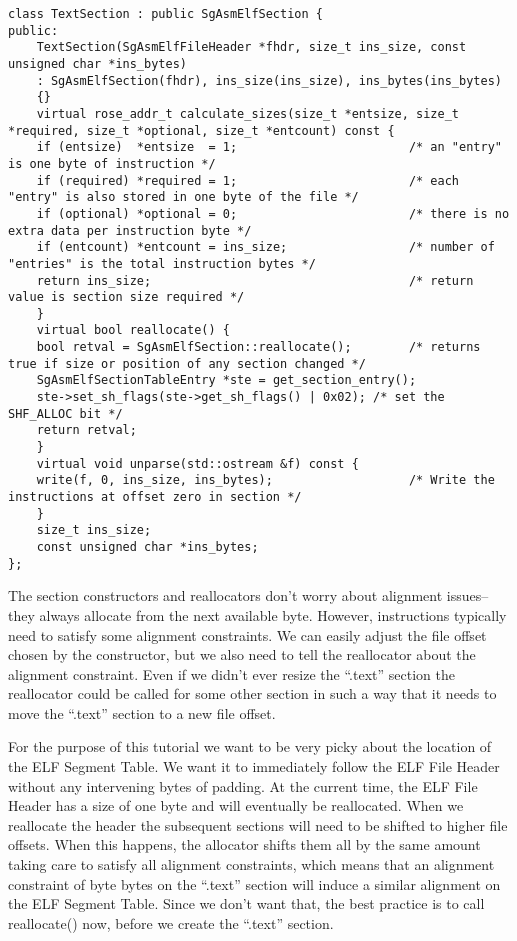 \begin{verbatim}
class TextSection : public SgAsmElfSection {
public:
    TextSection(SgAsmElfFileHeader *fhdr, size_t ins_size, const unsigned char *ins_bytes)
	: SgAsmElfSection(fhdr), ins_size(ins_size), ins_bytes(ins_bytes)
	{}
    virtual rose_addr_t calculate_sizes(size_t *entsize, size_t *required, size_t *optional, size_t *entcount) const {
	if (entsize)  *entsize  = 1;                        /* an "entry" is one byte of instruction */
	if (required) *required = 1;                        /* each "entry" is also stored in one byte of the file */
	if (optional) *optional = 0;                        /* there is no extra data per instruction byte */
	if (entcount) *entcount = ins_size;                 /* number of "entries" is the total instruction bytes */
	return ins_size;                                    /* return value is section size required */
    }
    virtual bool reallocate() {
	bool retval = SgAsmElfSection::reallocate();        /* returns true if size or position of any section changed */
	SgAsmElfSectionTableEntry *ste = get_section_entry();
	ste->set_sh_flags(ste->get_sh_flags() | 0x02); /* set the SHF_ALLOC bit */
	return retval;
    }
    virtual void unparse(std::ostream &f) const {
	write(f, 0, ins_size, ins_bytes);                   /* Write the instructions at offset zero in section */
    }
    size_t ins_size;
    const unsigned char *ins_bytes;
};
\end{verbatim}

The section constructors and reallocators don't worry about alignment
issues--they always allocate from the next available byte. However,
instructions typically need to satisfy some alignment constraints. We
can easily adjust the file offset chosen by the constructor, but we
also need to tell the reallocator about the alignment constraint. Even
if we didn't ever resize the ``.text'' section the reallocator could
be called for some other section in such a way that it needs to move
the ``.text'' section to a new file offset.

For the purpose of this tutorial we want to be very picky about the
location of the ELF Segment Table. We want it to immediately follow
the ELF File Header without any intervening bytes of padding. At the
current time, the ELF File Header has a size of one byte and will
eventually be reallocated. When we reallocate the header the
subsequent sections will need to be shifted to higher file
offsets. When this happens, the allocator shifts them all by the same
amount taking care to satisfy all alignment constraints, which means
that an alignment constraint of byte bytes on the ``.text'' section
will induce a similar alignment on the ELF Segment Table. Since we
don't want that, the best practice is to call reallocate() now, before
we create the ``.text'' section.

